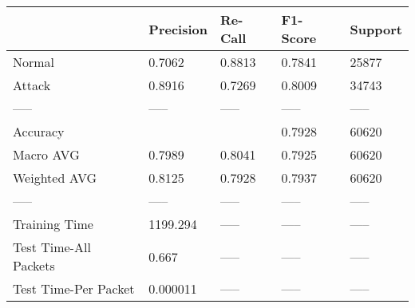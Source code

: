 \begin{tabular}{lllll}
\toprule
{} & Precision & Re-Call & F1-Score & Support \\
\midrule
Normal                &    0.7062 &  0.8813 &   0.7841 &   25877 \\
Attack                &    0.8916 &  0.7269 &   0.8009 &   34743 \\
-----                 &     ----- &   ----- &    ----- &   ----- \\
Accuracy              &           &         &   0.7928 &   60620 \\
Macro AVG             &    0.7989 &  0.8041 &   0.7925 &   60620 \\
Weighted AVG          &    0.8125 &  0.7928 &   0.7937 &   60620 \\
-----                 &     ----- &   ----- &    ----- &   ----- \\
Training Time         &  1199.294 &   ----- &    ----- &   ----- \\
Test Time-All Packets &     0.667 &   ----- &    ----- &   ----- \\
Test Time-Per Packet  &  0.000011 &   ----- &    ----- &   ----- \\
\bottomrule
\end{tabular}

